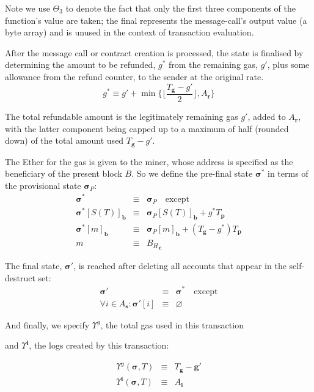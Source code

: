 \documentclass[9pt,oneside]{amsart}
\begin{document}
\begin{multicols}{2}
Note we use $\Theta_{3}$ to denote the fact that only the first three components of the function's value are taken; the final represents the message-call's output value (a byte array) and is unused in the context of transaction evaluation.

After the message call or contract creation is processed, the state is finalised by determining the amount to be refunded, $g^*$ from the remaining gas, $g'$, plus some allowance from the refund counter, to the sender at the original rate.
\begin{equation}
g^* \equiv g' + \min \{ \Big\lfloor \dfrac{T_\mathbf{g} - g'}{2} \Big\rfloor, A_\mathbf{r} \}
\end{equation}

The total refundable amount is the legitimately remaining gas $g'$, added to $A_\mathbf{r}$, with the latter component being capped up to a maximum of half (rounded down) of the total amount used $T_\mathbf{g} - g'$.

The Ether for the gas is given to the miner, whose address is specified as the beneficiary of the present block $B$. So we define the pre-final state $\boldsymbol{\sigma}^*$ in terms of the provisional state $\boldsymbol{\sigma}_P$:
\begin{eqnarray}
\boldsymbol{\sigma}^* & \equiv & \boldsymbol{\sigma}_P \quad \text{except} \\
\boldsymbol{\sigma}^*[S(T)]_\mathbf{b} & \equiv & \boldsymbol{\sigma}_P[S(T)]_\mathbf{b} + g^* T_\mathbf{p} \\
\boldsymbol{\sigma}^*[m]_\mathbf{b} & \equiv & \boldsymbol{\sigma}_P[m]_\mathbf{b} + (T_\mathbf{g} - g^*) T_\mathbf{p} \\
m & \equiv & {B_H}_\mathbf{c}
\end{eqnarray}

The final state, $\boldsymbol{\sigma}'$, is reached after deleting all accounts that appear in the self-destruct set:
\begin{eqnarray}
\boldsymbol{\sigma}' & \equiv & \boldsymbol{\sigma}^* \quad \text{except} \\
\forall i \in A_\mathbf{s}: \boldsymbol{\sigma}'[i] & \equiv & \varnothing
\end{eqnarray}

\hypertarget{Upsilong}{And finally, we specify $\Upsilon^g$, the total gas used in this transaction}\hypertarget{Upsilonl}{ and $\Upsilon^\mathbf{l}$, the logs created by this transaction:}
\begin{eqnarray}
\Upsilon^g(\boldsymbol{\sigma}, T) & \equiv & T_\mathbf{g} - \mathbf{g}' \\
\Upsilon^\mathbf{l}(\boldsymbol{\sigma}, T) & \equiv & A_\mathbf{l}
\end{eqnarray}


\end{multicols}
\end{document}
